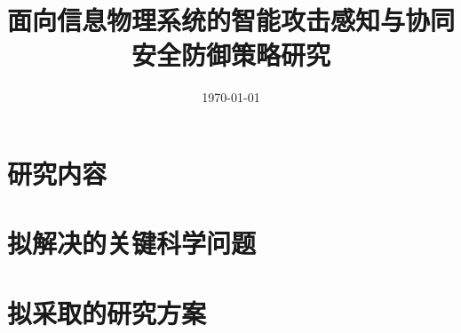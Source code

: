 \documentclass[UTF8,a4paper,twoside,12pt]{article}
\begin{document}
\title{面向信息物理系统的智能攻击感知与协同安全防御策略研究}
\author{}
\date{\today}

\maketitle

\newpage

\tableofcontents

\newpage






\section{研究内容}
\section{拟解决的关键科学问题}
\section{拟采取的研究方案}
\end{document}
